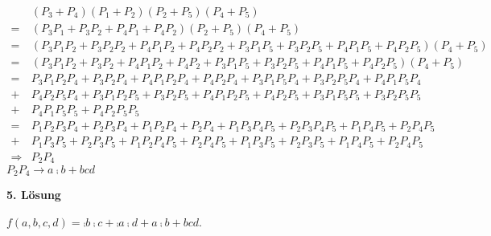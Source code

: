 \documentclass{CInf_practice}
\begin{document}
\begin{align*}
 &(P_3+P_4)(P_1+P_2)(P_2+P_5)(P_4+P_5) \\
=&(P_3P_1+P_3P_2+P_4P_1+P_4P_2)(P_2+P_5)(P_4+P_5) \\
=&(P_3P_1P_2+P_3P_2P_2+P_4P_1P_2+P_4P_2P_2+P_3P_1P_5+P_3P_2P_5+P_4P_1P_5+P_4P_2P_5)(P_4+P_5) \\
=&(P_3P_1P_2+P_3P_2+P_4P_1P_2+P_4P_2+P_3P_1P_5+P_3P_2P_5+P_4P_1P_5+P_4P_2P_5)(P_4+P_5) \\
=&P_3P_1P_2P_4+P_3P_2P_4+P_4P_1P_2P_4+P_4P_2P_4+P_3P_1P_5P_4+P_3P_2P_5P_4+P_4P_1P_5P_4\\
+&P_4P_2P_5P_4+P_3P_1P_2P_5+P_3P_2P_5+P_4P_1P_2P_5+P_4P_2P_5+P_3P_1P_5P_5+P_3P_2P_5P_5\\
+&P_4P_1P_5P_5+P_4P_2P_5P_5 \\
=&P_1P_2P_3P_4+P_2P_3P_4+P_1P_2P_4+P_2P_4+P_1P_3P_4P_5+P_2P_3P_4P_5+P_1P_4P_5+P_2P_4P_5 \\
+&P_1P_3P_5+P_2P_3P_5+P_1P_2P_4P_5+P_2P_4P_5+P_1P_3P_5+P_2P_3P_5+P_1P_4P_5+P_2P_4P_5 \\
\Rightarrow&P_2P_4
\end{align*}
$P_2P_4\rightarrow a\comp b + bcd$

\bigskip

\textbf{5. Lösung}

$f(a,b,c,d)=\comp b \comp c + \comp a \comp d + a \comp b + bcd$.
\end{document}
